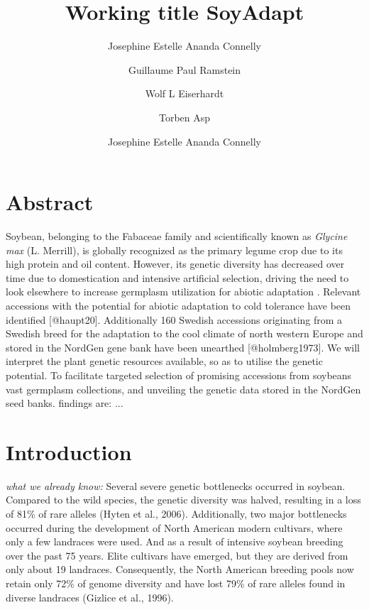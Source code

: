\documentclass[9pt, onecolumn,twoside]{gsajnl}
\title{Working title SoyAdapt}
\author[1,$\dagger$,$\ast$]{Josephine Estelle Ananda Connelly}
\author[2]{Guillaume Paul Ramstein}
\author[3]{Wolf L Eiserhardt}
\author[4]{Torben Asp}
\author[5]{Josephine Estelle Ananda Connelly}
\affil[1]{Centre for Quantitative Genetics and Genomics, Faculty of Technical Sciences, Aarhus University (DK).}
\affil[2]{Department of Biology, Faculty of Natural Sciences, Aarhus University, (DK).}
\affil[3]{Royal Botanic Gardens, Kew, (UK).}
\begin{document}
\maketitle
\thispagestyle{firststyle}
\vspace{-13pt}%


\section{Abstract}

Soybean, belonging to the Fabaceae family and scientifically known as \textit{Glycine max} (L. Merrill), is globally recognized as the primary legume crop due to its high protein and oil content. However, its genetic diversity has decreased over time due to domestication and intensive artificial selection, driving the need to look elsewhere to increase germplasm utilization for abiotic adaptation \citep{hyten06, gizlice96}.  Relevant accessions with the potential for abiotic adaptation to cold tolerance have been identified [@haupt20]. Additionally 160 Swedish accessions originating from a Swedish breed for the adaptation to the cool climate of north western Europe and stored in the NordGen gene bank have been unearthed [@holmberg1973]. We will interpret the plant genetic resources available, so as to utilise the genetic potential. To facilitate targeted selection of promising accessions from soybeans vast germplasm collections,  and unveiling the genetic data stored in the NordGen seed banks. findings are: ... 

\section{Introduction}

\textit{what we already know:} Several severe genetic bottlenecks occurred in soybean. Compared to the wild species, the genetic diversity was halved, resulting in a loss of 81\% of rare alleles (Hyten et al., 2006). Additionally, two major bottlenecks occurred during the development of North American modern cultivars, where only a few landraces were used. And as a result of intensive soybean breeding over the past 75 years. Elite cultivars have emerged, but they are derived from only about 19 landraces. Consequently, the North American breeding pools now retain only 72\% of genome diversity and have lost 79\% of rare alleles found in diverse landraces (Gizlice et al., 1996).
\end{document}
